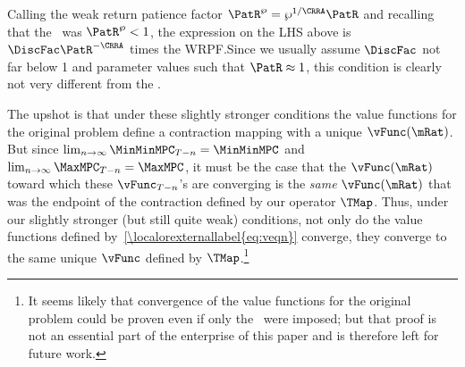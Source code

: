\documentclass[\econtexRoot/BufferStockTheory]{subfiles}
\begin{document}
Calling the weak return patience factor $\PatR^{\wp}=\wp^{1/\CRRA}\PatR$ and recalling that the \WRIC~was $\PatR^{\wp}<1$, the expression on the LHS above is $\DiscFac \PatR^{-\CRRA}$ times the WRPF.\@ Since we usually assume $\DiscFac$ not far below 1 and parameter values such that $\PatR \approx 1$, this condition is clearly not very different from the \WRIC.\@

The upshot is that under these slightly stronger conditions the value functions for the original problem define a contraction mapping with a unique $\vFunc(\mRat)$.  But since $\lim_{n \rightarrow \infty} \MinMinMPC_{T-n} = \MinMinMPC$ and $\lim_{n \rightarrow \infty} \MaxMPC_{T-n} = \MaxMPC$, it must be the case that the $\vFunc(\mRat)$ toward which these $\vFunc_{T-n}$'s are converging is the \textit{same} $\vFunc(\mRat)$ that was the endpoint of the contraction defined by our operator $\TMap$.  Thus, under our slightly stronger (but still quite weak) conditions, not only do the value functions defined by~\eqref{\localorexternallabel{eq:veqn}} converge, they converge to the same unique $\vFunc$ defined by $\TMap$.\footnote{It seems likely that convergence of the value functions for the original problem could be proven even if only the \WRIC~were imposed; but that proof is not an essential part of the enterprise of this paper and is therefore left for future work.}

\onlyinsubfile{\pagebreak}
\end{document}

